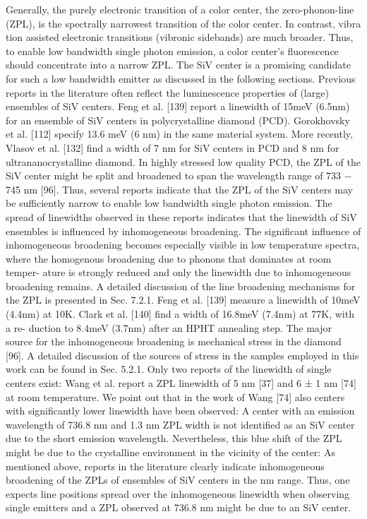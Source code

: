       Generally, the purely electronic transition of a color center, the zero-phonon-line (ZPL), is the spectrally narrowest transition of the color center. In contrast, vibra
      tion assisted electronic transitions (vibronic sidebands) are much broader. Thus, to enable low bandwidth single photon emission, a color center’s fluorescence should concentrate into a narrow ZPL. The SiV center is a promising candidate for such a low bandwidth emitter as discussed in the following sections.
      Previous reports in the literature often reflect the luminescence properties of (large) ensembles of SiV centers. Feng et al. [139] report a linewidth of 15meV (6.5nm) for an ensemble of SiV centers in polycrystalline diamond (PCD). Gorokhovsky et al. [112] specify 13.6 meV (6 nm) in the same material system. More recently, Vlasov et al. [132] find a width of 7 nm for SiV centers in PCD and 8 nm for ultrananocrystalline diamond. In highly stressed low quality PCD, the ZPL of the SiV center might be split and broadened to span the wavelength range of 733 − 745 nm [96]. Thus, several reports indicate that the ZPL of the SiV centers may be sufficiently narrow to enable low bandwidth single photon emission. The spread of linewidths observed in these reports indicates that the linewidth of SiV ensembles is influenced by inhomogeneous broadening. The significant influence of inhomogeneous broadening becomes especially visible in low temperature spectra, where the homogenous broadening due to phonons that dominates at room temper- ature is strongly reduced and only the linewidth due to inhomogeneous broadening remains. A detailed discussion of the line broadening mechanisms for the ZPL is presented in Sec. 7.2.1. Feng et al. [139] measure a linewidth of 10meV (4.4nm) at 10K. Clark et al. [140] find a width of 16.8meV (7.4nm) at 77K, with a re- duction to 8.4meV (3.7nm) after an HPHT annealing step. The major source for the inhomogeneous broadening is mechanical stress in the diamond [96]. A detailed discussion of the sources of stress in the samples employed in this work can be found in Sec. 5.2.1.
      Only two reports of the linewidth of single centers exist: Wang et al. report a ZPL linewidth of 5 nm [37] and 6 ± 1 nm [74] at room temperature. We point out that in the work of Wang [74] also centers with significantly lower linewidth have been observed: A center with an emission wavelength of 736.8 nm and 1.3 nm ZPL width is not identified as an SiV center due to the short emission wavelength. Nevertheless, this blue shift of the ZPL might be due to the crystalline environment in the vicinity of the center: As mentioned above, reports in the literature clearly indicate inhomogeneous broadening of the ZPLs of ensembles of SiV centers in the nm range. Thus, one expects line positions spread over the inhomogeneous linewidth when observing single emitters and a ZPL observed at 736.8 nm might be due to an SiV center.
